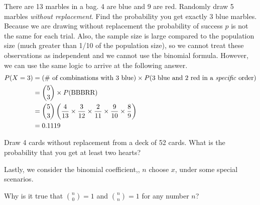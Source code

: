 \D{\newpage}

\begin{examplewrap}
\begin{nexample}{There are 13 marbles in a bag. 4 are blue and 9 are red. Randomly draw 5 marbles \emph{without replacement}. Find the probability you get exactly 3 blue marbles.  Because we are drawing without replacement the probability of success $p$ is not the same for each trial.  Also, the sample size is large compared to the population size (much greater than 1/10 of the population size), so we cannot treat these observations as independent and we cannot use the binomial formula. However, we can use the same logic to arrive at the following answer. }
\begin{align*}
P(X = 3) &= (\text{\# of combinations with 3 blue})\times P(\text{3 blue and 2 red in a \emph{specific} order}) \\
&={5\choose 3}\times P(\text{BBBRR}) \\
&= {5\choose 3}\left(\frac{4}{13}\times \frac{3}{12}\times \frac{2}{11} \times \frac{9}{10} \times \frac{8}{9}\right) \\
&= 0.1119
\end{align*}
\end{nexample}
\end{examplewrap}

\begin{exercisewrap}
\begin{nexercise}
{Draw 4 cards without replacement from a deck of 52 cards.  What is the probability that you get at least two hearts?}\footnotemark
\end{nexercise}
\end{exercisewrap}

Lastly, we consider the binomial coefficient,,
$n$ choose $x$, under some special scenarios.

\begin{exercisewrap}
\begin{nexercise}
Why is it true that ${n \choose 0}=1$ and ${n \choose n}=1$
for any number $n$?\footnotemark
\end{nexercise}
\end{exercisewrap}

